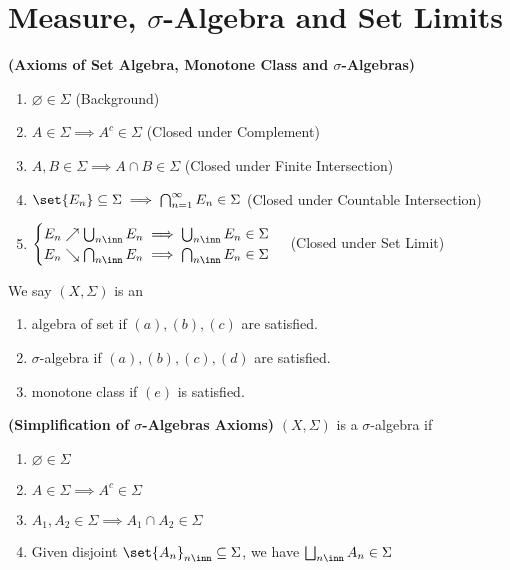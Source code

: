 \documentclass{report}
\begin{document}
\section{Measure, $\sigma$-Algebra and Set Limits}
\begin{axiom}
\label{0.7.1}
\textbf{(Axioms of Set Algebra, Monotone Class and $\sigma$-Algebras)} 
\begin{enumerate}[label=(\alph*)]
  \item $\varnothing\in \Sigma $ (Background)
  \item $A \in \Sigma \implies A^c \in \Sigma $ (Closed under Complement)
  \item $A,B \in \Sigma \implies A\cap B \in \Sigma$ (Closed under Finite Intersection)
   \item $\set{E_n}\subseteq \Sigma \implies \bigcap_{n=1}^\infty E_n \in \Sigma$ (Closed under Countable Intersection)
   \item $\begin{cases}
     E_n \nearrow \bigcup_{n\inn} E_n \implies \bigcup_{n\inn} E_n \in \Sigma \\
     E_n \searrow \bigcap_{n\inn} E_n \implies \bigcap_{n\inn} E_n \in \Sigma 
   \end{cases}$ (Closed under Set Limit)
\end{enumerate}
We say $(X,\Sigma)$ is an
\begin{enumerate}[label=(\roman*)]
  \item algebra of set if $(a),(b),(c)$ are satisfied. 
  \item $\sigma$-algebra if $(a),(b),(c),(d)$ are satisfied. 
  \item monotone class if $(e)$ is satisfied.
\end{enumerate}
\end{axiom}
\begin{theorem}
\label{0.7.2}
\textbf{(Simplification of $\sigma$-Algebras Axioms)} $(X,\Sigma)$ is a $\sigma$-algebra if 
\begin{enumerate}[label=(\alph*)]
  \item $\varnothing \in \Sigma$
  \item $A\in \Sigma \implies A^c \in \Sigma$ 
  \item $A_1,A_2 \in \Sigma \implies A_1\cap A_2 \in \Sigma$
  \item Given disjoint $\set{A_n}_{n\inn}\subseteq\Sigma$, we have $ \bigsqcup_{n\inn} A_n \in \Sigma  $
\end{enumerate}
\end{theorem}
\end{document}
